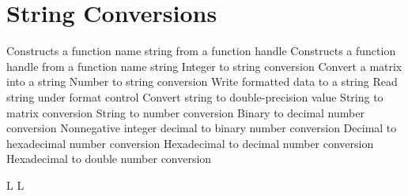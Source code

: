 \section{String Conversions}{}
	{Constructs a function name string from a function handle}
	{Constructs a function handle from a function name string}
	{Integer to string conversion}
	{Convert a matrix into a string}
	{Number to string conversion}
	{Write formatted data to a string}
	{Read string under format control}
	{Convert string to double-precision value}
	{String to matrix conversion}
	{String to number conversion}
	{Binary to decimal number conversion}
	{Nonnegative integer decimal to binary number conversion}
	{Decimal to hexadecimal number conversion}
	{Hexadecimal to decimal number conversion}
	{Hexadecimal to double number conversion}


% 

\copyrightnotice

\supereject
\if L\lr \else\null\vfill\eject\fi
\if L\lr \else\null\vfill\eject\fi
\bye

